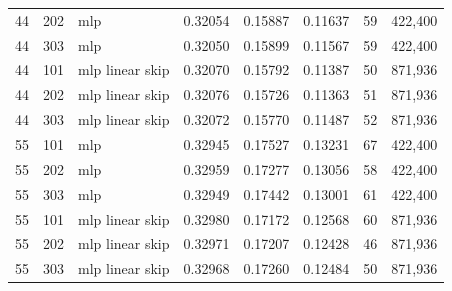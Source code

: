 \begin{table}[ht]
\begin{tabular}{rrlrrrrr}
44 & 202 & mlp & 0.32054 & 0.15887 & 0.11637 & 59 & 422,400 \\
44 & 303 & mlp & 0.32050 & 0.15899 & 0.11567 & 59 & 422,400 \\
44 & 101 & mlp linear skip & 0.32070 & 0.15792 & 0.11387 & 50 & 871,936 \\
44 & 202 & mlp linear skip & 0.32076 & 0.15726 & 0.11363 & 51 & 871,936 \\
44 & 303 & mlp linear skip & 0.32072 & 0.15770 & 0.11487 & 52 & 871,936 \\
55 & 101 & mlp & 0.32945 & 0.17527 & 0.13231 & 67 & 422,400 \\
55 & 202 & mlp & 0.32959 & 0.17277 & 0.13056 & 58 & 422,400 \\
55 & 303 & mlp & 0.32949 & 0.17442 & 0.13001 & 61 & 422,400 \\
55 & 101 & mlp linear skip & 0.32980 & 0.17172 & 0.12568 & 60 & 871,936 \\
55 & 202 & mlp linear skip & 0.32971 & 0.17207 & 0.12428 & 46 & 871,936 \\
55 & 303 & mlp linear skip & 0.32968 & 0.17260 & 0.12484 & 50 & 871,936 \\
\bottomrule\end{tabular}\end{table}
